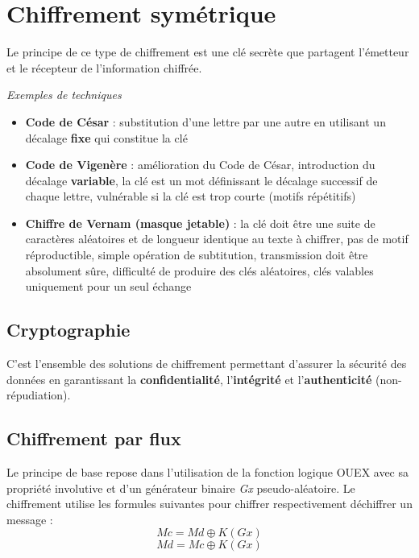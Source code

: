 \documentclass[12pt, a4paper]{article}
\begin{document}
	\section{Chiffrement symétrique}
	Le principe de ce type de chiffrement est une clé secrète que partagent
	l'émetteur et le récepteur de l'information chiffrée.
	\par
	\textit{Exemples de techniques}
	\begin{itemize}
		\item \textbf{Code de César} : substitution d'une lettre par une autre en
		utilisant un décalage \textbf{fixe} qui constitue la clé
		\item \textbf{Code de Vigenère} : amélioration du Code de César,
		introduction du décalage \textbf{variable}, la clé est un mot définissant
		le décalage successif de chaque lettre, vulnérable si la clé est trop courte
		 (motifs répétitifs)
		\item \textbf{Chiffre de Vernam (masque jetable)} : la clé doit être une
		suite de caractères aléatoires et de longueur identique au texte à chiffrer,
		 pas de motif réproductible, simple opération de subtitution, transmission
		doit être absolument sûre, difficulté de produire des clés aléatoires, clés
		valables uniquement pour un seul échange
	\end{itemize}
	\subsection{Cryptographie}
	C'est l'ensemble des solutions de chiffrement permettant d'assurer la sécurité
	 des données en garantissant la \textbf{confidentialité}, l'\textbf{intégrité}
	  et l'\textbf{authenticité} (non-répudiation).
	\subsection{Chiffrement par flux}
	Le principe de base repose dans l'utilisation de la fonction logique OUEX avec
	 sa propriété involutive et d'un générateur binaire \textit{Gx}
	 pseudo-aléatoire. Le chiffrement utilise les formules suivantes pour chiffrer
	  respectivement déchiffrer un message :
	\[ Mc = Md \oplus K(Gx) \]
	\[ Md = Mc \oplus K(Gx) \]
\end{document}
